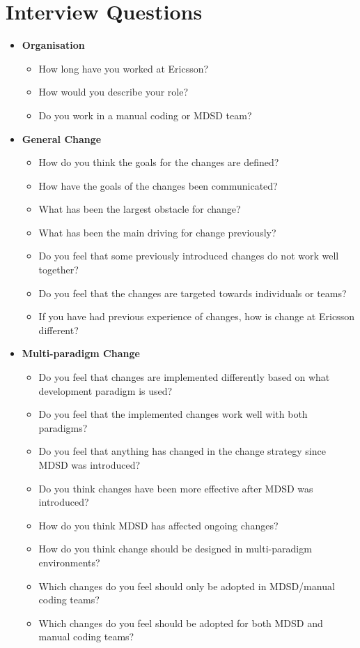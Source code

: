 \documentclass[10pt,twocolumn]{article}
\begin{document}
\newpage
\appendix

\section{Interview Questions}
\begin{itemize}
\item \textbf{Organisation}
\begin{itemize}
\item How long have you worked at Ericsson?
\item How would you describe your role?
\item Do you work in a manual coding or MDSD team?
\end{itemize}

\item \textbf{General Change}
\begin{itemize}
\item How do you think the goals for the changes are defined?
\item How have the goals of the changes been communicated? 
\item What has been the largest obstacle for change?
\item What has been the main driving for change previously?
\item Do you feel that some previously introduced changes do not work well together?
\item Do you feel that the changes are targeted towards individuals or teams? 
\item If you have had previous experience of changes, how is change at Ericsson different? 
\end{itemize}

\item \textbf{Multi-paradigm Change}
\begin{itemize}
\item Do you feel that changes are implemented differently based on what development paradigm is used?
\item Do you feel that the implemented changes work well with both paradigms? 
\item Do you feel that anything has changed in the change strategy since MDSD was introduced? 
\item Do you think changes have been more effective after MDSD was introduced? 
\item How do you think MDSD has affected ongoing changes?
\item How do you think change should be designed in multi-paradigm environments?
\item Which changes do you feel should only be adopted in MDSD/manual coding teams?
\item Which changes do you feel should be adopted for both MDSD and manual coding teams?
\end{itemize}

\end{itemize}
\end{document}
